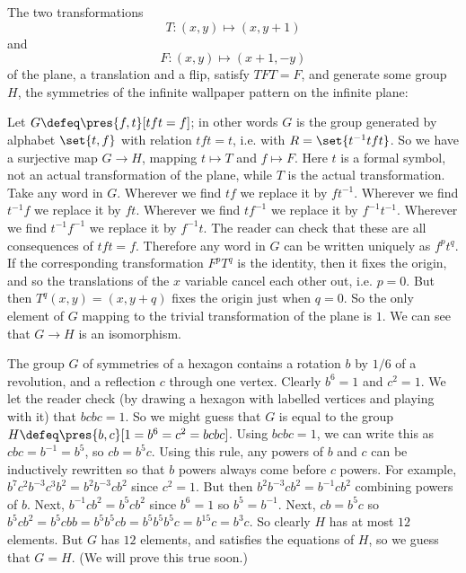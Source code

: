 \begin{example}
The two transformations
\[
T \colon (x,y) \mapsto (x,y+1)
\]
and
\[
F \colon (x,y) \mapsto (x+1,-y)
\]
of the plane, a translation and a flip, satisfy \(TFT=F\), and generate some group \(H\), the symmetries of the infinite wallpaper pattern on the infinite plane:
\begin{center}

\end{center}
Let \(G \defeq \pres{f,t}[tft=f]\); in other words \(G\) is the group generated by alphabet \(\set{t,f}\) with relation \(tft=t\), i.e. with \(R=\set{t^{-1}tft}\).
So we have a surjective map \(G \to H\), mapping \(t \mapsto T\) and \(f \mapsto F\).
Here \(t\) is a formal symbol, not an actual transformation of the plane, while \(T\) is the actual transformation.
Take any word in \(G\).
Wherever we find \(tf\) we replace it by \(ft^{-1}\).
Wherever we find \(t^{-1}f\) we replace it by \(ft\).
Wherever we find \(tf^{-1}\) we replace it by \(f^{-1}t^{-1}\).
Wherever we find \(t^{-1}f^{-1}\) we replace it by \(f^{-1}t\).
The reader can check that these are all consequences of \(tft=f\).
Therefore any word in \(G\) can be written uniquely as \(f^p t^q\).
If the corresponding transformation \(F^p T^q\) is the identity, then it fixes the origin, and so the translations of the \(x\) variable cancel each other out, i.e. \(p=0\).
But then \(T^q(x,y)=(x,y+q)\) fixes the origin just when \(q=0\).
So the only element of \(G\) mapping to the trivial transformation of the plane is \(1\).
We can see that \(G \to H\) is an isomorphism.
\end{example}

\begin{example}
The group \(G\) of symmetries of a hexagon contains a rotation \(b\) by \(1/6\) of a revolution, and a reflection \(c\) through one vertex.
Clearly \(b^6=1\) and \(c^2=1\).
We let the reader check (by drawing a hexagon with labelled vertices and playing with it) that \(bcbc=1\).
So we might guess that \(G\) is equal to the group \(H\defeq \pres{b,c}[1=b^6=c^2=bcbc]\).
Using \(bcbc=1\), we can write this as \(cbc=b^{-1}=b^5\), so \(cb=b^5c\).
Using this rule, any powers of \(b\) and \(c\) can be inductively rewritten so that \(b\) powers always come before \(c\) powers.
For example, \(b^7c^2b^{-3}c^3b^2=b^2b^{-3}cb^2\) since \(c^2=1\).
But then \(b^2b^{-3}cb^2=b^{-1}cb^2\) combining powers of \(b\).
Next, \(b^{-1}cb^2=b^5cb^2\) since \(b^6=1\) so \(b^5=b^{-1}\).
Next, \(cb=b^5c\) so \(b^5cb^2=b^5cbb=b^5b^5cb=b^5b^5b^5c=b^{15}c=b^3c\).
So clearly \(H\) has at most \(12\) elements.
But \(G\) has \(12\) elements, and satisfies the equations of \(H\), so we guess that \(G=H\).
(We will prove this true soon.)
\end{example}

